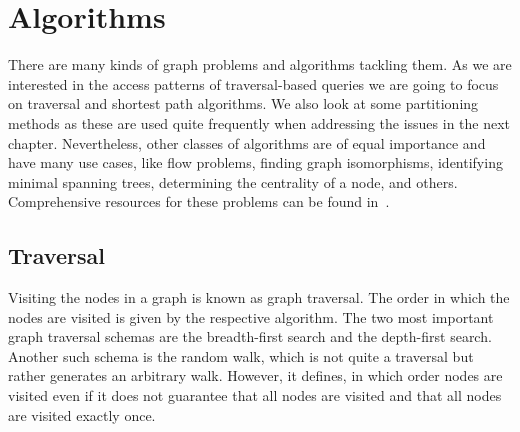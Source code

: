     \newpage
    \section{Algorithms}\label{queries}
        There are many kinds of graph problems and algorithms tackling them. As we are interested in the access patterns of traversal-based queries we are going to focus on traversal and shortest path algorithms. We also look at some partitioning methods as these are used quite frequently when addressing the issues in the next chapter.
        Nevertheless, other classes of algorithms are of equal importance and have many use cases, like flow problems, finding graph isomorphisms, identifying minimal spanning trees, determining the centrality of a node, and others.
        Comprehensive resources for these problems can be found in~\autocite{steger2007diskrete, Gross1998GraphTA, aho1974design, cormen2009introduction, Goodrich2014AlgorithmDA}.
        
        \subsection{Traversal}
            Visiting the nodes in a graph is known as graph traversal. 
            The order in which the nodes are visited is given by the respective algorithm. 
            The two most important graph traversal schemas are the breadth-first search and the depth-first search. 
            Another such schema is the random walk, which is not quite a traversal but rather generates an arbitrary walk. 
            However, it defines, in which order nodes are visited even if it does not guarantee that all nodes are visited and that all nodes are visited exactly once.
